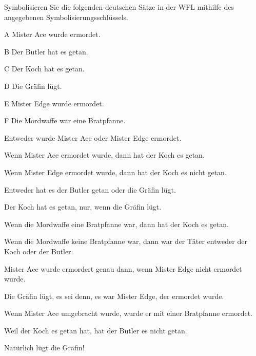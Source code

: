 \problempart 
Symbolisieren Sie die folgenden deutschen Sätze in der WFL mithilfe des angegebenen Symbolisierungsschlüssels.
\begin{ekey}
\item[A] Mister Ace wurde ermordet.
\item[B] Der Butler hat es getan.
\item[C] Der Koch hat es getan.
\item[D] Die Gräfin lügt.
\item[E] Mister Edge wurde ermordet.
\item[F] Die Mordwaffe war eine Bratpfanne.
\end{ekey}
\begin{earg}
\item Entweder wurde Mister Ace oder Mister Edge ermordet.
\item Wenn Mister Ace ermordet wurde, dann hat der Koch es getan.
\item Wenn Mister Edge ermordet wurde, dann hat der Koch es nicht getan.
\item Entweder hat es der Butler getan oder die Gräfin lügt.
\item Der Koch hat es getan, nur, wenn die Gräfin lügt.
\item Wenn die Mordwaffe eine Bratpfanne war, dann hat der Koch es getan.
\item Wenn die Mordwaffe keine Bratpfanne war, dann war der Täter entweder der Koch oder der Butler.
\item Mister Ace wurde ermordert genau dann, wenn Mister Edge nicht ermordet wurde.
\item Die Gräfin lügt, es sei denn, es war Mister Edge, der ermordet wurde.
\item Wenn Mister Ace umgebracht wurde, wurde er mit einer Bratpfanne ermordet.
\item Weil der Koch es getan hat, hat der Butler es nicht getan.
\item Natürlich lügt die Gräfin!
\end{earg}
\solutions


